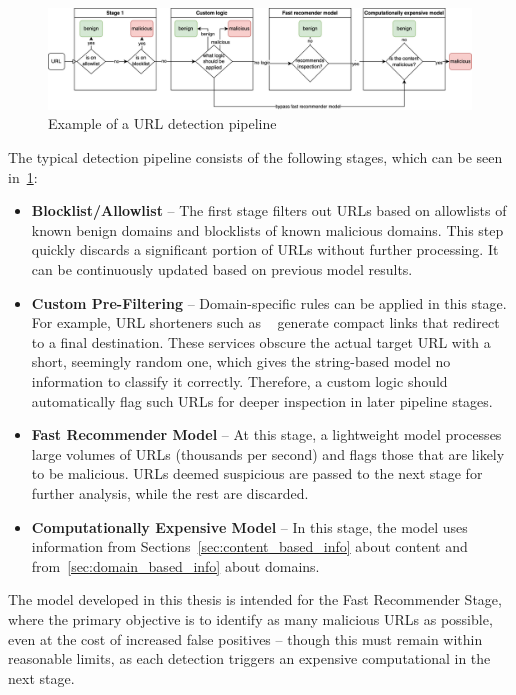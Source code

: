 \begin{figure}[H]
    \centering
    \includegraphics[width=1\textwidth]{images/pipeline_diagram.png}
    \caption{Example of a URL detection pipeline}
    \label{fig:detection_pipeline}
\end{figure}

The typical detection pipeline consists of the following stages, which can be seen in~\ref{fig:detection_pipeline}:
\begin{itemize}
    \item \textbf{Blocklist/Allowlist} -- The first stage filters out URLs based on allowlists of known benign domains and blocklists of known malicious domains. This step quickly discards a significant portion of URLs without further processing. It can be continuously updated based on previous model results.

    \item \textbf{Custom Pre-Filtering} -- Domain-specific rules can be applied in this stage. For example, URL shorteners such as ~\cite{bitly} generate compact links that redirect to a final destination. These services obscure the actual target URL with a short, seemingly random one, which gives the string-based model no information to classify it correctly. Therefore, a custom logic should automatically flag such URLs for deeper inspection in later pipeline stages.

    \item \textbf{Fast Recommender Model} -- At this stage, a lightweight model processes large volumes of URLs (thousands per second) and flags those that are likely to be malicious. URLs deemed suspicious are passed to the next stage for further analysis, while the rest are discarded.

    \item \textbf{Computationally Expensive Model} -- In this stage, the model uses information from Sections~\ref{sec:content_based_info} about content and from~\ref{sec:domain_based_info} about domains.
\end{itemize}

The model developed in this thesis is intended for the Fast Recommender Stage, where the primary objective is to identify as many malicious URLs as possible, even at the cost of increased false positives -- though this must remain within reasonable limits, as each detection triggers an expensive computational in the next stage.